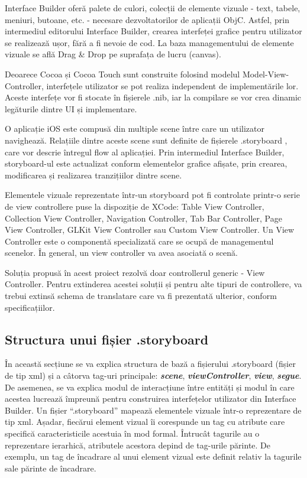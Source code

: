 Interface Builder oferă palete de culori, colecții de elemente vizuale - text, tabele, meniuri, butoane, etc. - necesare dezvoltatorilor de aplicații ObjC. Astfel, prin intermediul editorului Interface Builder, crearea interfeței grafice pentru utilizator se realizează ușor, fără a fi nevoie de cod. La baza managementului de elemente vizuale se află Drag \& Drop pe suprafața de lucru (canvas). 

Deoarece Cocoa și Cocoa Touch sunt construite folosind modelul Model-View-Controller, interfețele utilizator se pot realiza independent de implementările lor. Aceste interfețe vor fi stocate în fișierele .nib, iar la compilare se vor crea dinamic legăturile dintre UI și implementare.

O aplicație iOS este compusă din multiple scene între care un utilizator navighează. Relațiile dintre aceste scene sunt definite de fișierele .storyboard \cite{StructuraXcode}, care vor descrie întregul flow al aplicației. Prin intermediul Interface Builder, storyboard-ul este actualizat conform elementelor grafice afișate, prin crearea, modificarea și realizarea tranzițiilor dintre scene.

Elementele vizuale reprezentate într-un storyboard pot fi controlate printr-o serie de view controllere puse la dispoziție de XCode: Table View Controller, Collection View Controller, Navigation Controller, Tab Bar Controller, Page View Controller, GLKit View Controller sau Custom View Controller. Un View Controller este o componentă specializată care se ocupă de managementul scenelor. În general, un view controller va avea asociată o scenă. 

Soluția propusă în acest proiect rezolvă doar controllerul generic - View Controller. Pentru extinderea acestei soluții și pentru alte tipuri de controllere, va trebui extinsă schema de translatare care va fi prezentată ulterior, conform specificațiilor. 

\subsection{Structura unui fișier .storyboard}

În această secțiune se va explica structura de bază a fișierului .storyboard (fișier de tip xml) și a câtorva tag-uri principale: \textbf{\textit{scene}}, \textbf{\textit{viewController}}, \textbf{\textit{view}}, \textbf{\textit{segue}}. De asemenea, se va explica modul de interacțiune între entități și modul în care acestea lucrează împreună pentru construirea interfețelor utilizator din Interface Builder.
Un fișier “.storyboard” mapează elementele vizuale într-o reprezentare de tip xml. Așadar, fiecărui element vizual îi corespunde un tag cu atribute care specifică caracteristicile acestuia în mod formal. Întrucât tagurile au o reprezentare ierarhică, atributele acestora depind de tag-urile părinte. De exemplu, un tag de încadrare al unui element vizual este definit relativ la tagurile sale părinte de încadrare.

